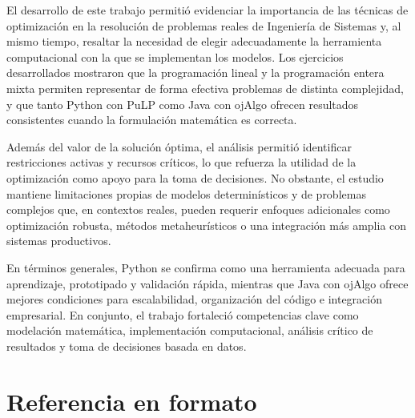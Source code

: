 \documentclass[12pt,a4paper]{article}
\begin{document}
El desarrollo de este trabajo permitió evidenciar la importancia de las técnicas de optimización en la resolución de problemas reales de Ingeniería de Sistemas y, al mismo tiempo, resaltar la necesidad de elegir adecuadamente la herramienta computacional con la que se implementan los modelos. Los ejercicios desarrollados mostraron que la programación lineal y la programación entera mixta permiten representar de forma efectiva problemas de distinta complejidad, y que tanto Python con PuLP como Java con ojAlgo ofrecen resultados consistentes cuando la formulación matemática es correcta.

Además del valor de la solución óptima, el análisis permitió identificar restricciones activas y recursos críticos, lo que refuerza la utilidad de la optimización como apoyo para la toma de decisiones. No obstante, el estudio mantiene limitaciones propias de modelos determinísticos y de problemas complejos que, en contextos reales, pueden requerir enfoques adicionales como optimización robusta, métodos metaheurísticos o una integración más amplia con sistemas productivos.

En términos generales, Python se confirma como una herramienta adecuada para aprendizaje, prototipado y validación rápida, mientras que Java con ojAlgo ofrece mejores condiciones para escalabilidad, organización del código e integración empresarial. En conjunto, el trabajo fortaleció competencias clave como modelación matemática, implementación computacional, análisis crítico de resultados y toma de decisiones basada en datos.

\section{Referencia en formato}
\end{document}
